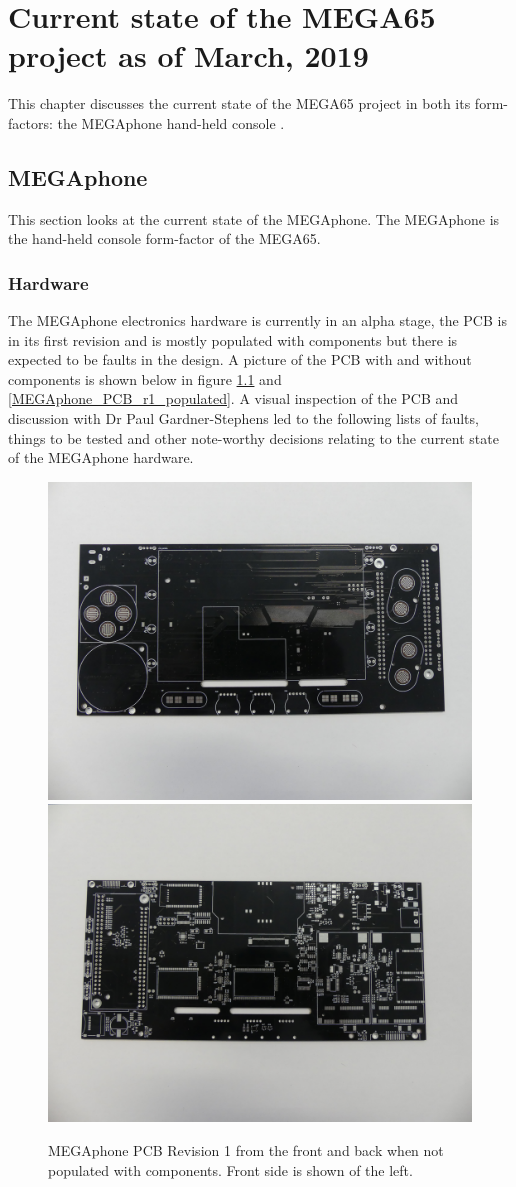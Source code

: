 
\chapter{Current state of the MEGA65 project as of March, 2019}
\label{cha: Chapter5}
This chapter discusses the current state of the MEGA65 project in both its form-factors: the MEGAphone hand-held console . 
\section{MEGAphone}
This section looks at the current state of the MEGAphone. The MEGAphone is the hand-held console form-factor of the MEGA65. 

\subsection{Hardware}
The MEGAphone electronics hardware is currently in an alpha stage, the PCB is in its first revision and is mostly populated with components but there is expected to be faults in the design. A picture of the PCB with and without components is shown below in figure \ref{MEGAphone_PCB_r1_empty} and \ref{MEGAphone_PCB_r1_populated}. A visual inspection of the PCB and discussion with Dr Paul Gardner-Stephens led to the following lists of faults, things to be tested and other note-worthy decisions relating to the current state of the MEGAphone hardware. \\

\begin{figure} \begin{center}
\includegraphics[width=.3\linewidth]{pics/MEGAphone_PCB_r1_empty_front} 
\includegraphics[width=.3\linewidth]{pics/MEGAphone_PCB_r1_empty_back} 
\end{center} 
\caption{MEGAphone PCB Revision 1 from the front and back when not populated with components. Front side is shown of the left.\\}
\label{MEGAphone_PCB_r1_empty}
\end{figure}

